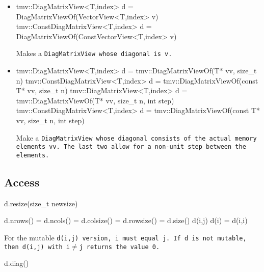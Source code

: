 \begin{itemize}
\item
\begin{tmvcode}
tmv::DiagMatrixView<T,index> d = 
      DiagMatrixViewOf(VectorView<T,index> v)
tmv::ConstDiagMatrixView<T,index> d = 
      DiagMatrixViewOf(ConstVectorView<T,index> v)
\end{tmvcode}
Makes a \tt{DiagMatrixView} whose diagonal is \tt{v}.

\item
\begin{tmvcode}
tmv::DiagMatrixView<T,index> d = 
      tmv::DiagMatrixViewOf(T* vv, size_t n)
tmv::ConstDiagMatrixView<T,index> d = 
      tmv::DiagMatrixViewOf(const T* vv, size_t n)
tmv::DiagMatrixView<T,index> d = 
      tmv::DiagMatrixViewOf(T* vv, size_t n, int step)
tmv::ConstDiagMatrixView<T,index> d = 
      tmv::DiagMatrixViewOf(const T* vv, size_t n, int step)
\end{tmvcode}
Make a \tt{DiagMatrixView} whose diagonal consists of the actual memory elements \tt{vv}.  The last two allow for a non-unit step between the elements.

\end{itemize}


\subsection{Access}
\label{DiagMatrix_Access}

\begin{tmvcode}
d.resize(size_t newsize)
\end{tmvcode}

\begin{tmvcode}
d.nrows() = d.ncols() = d.colsize() = d.rowsize() = d.size()
d(i,j)
d(i) = d(i,i)
\end{tmvcode}
For the mutable \tt{d(i,j)} version, 
\tt{i} must equal \tt{j}.
If \tt{d} is not mutable, then \tt{d(i,j)} with \tt{i}$\neq$\tt{j} returns the 
value 0.

\begin{tmvcode}
d.diag()
\end{tmvcode}


